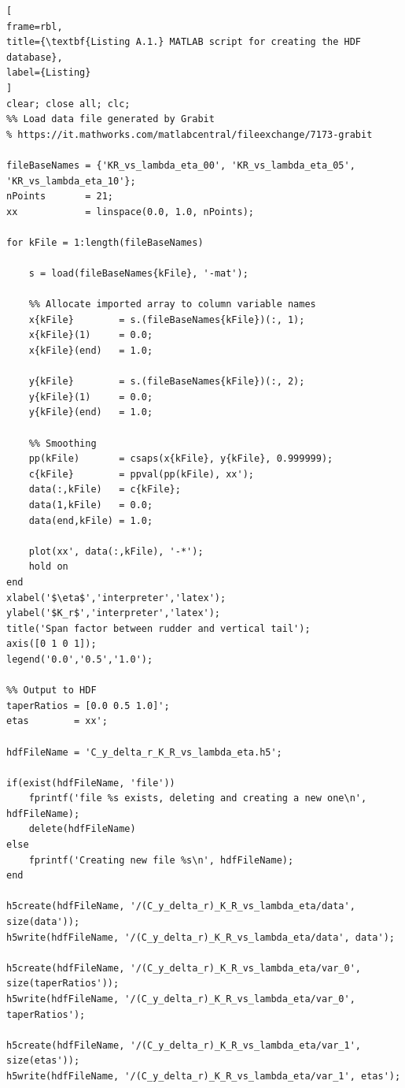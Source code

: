 \bigskip
\lstset{language=Matlab}
\begin{lstlisting}[
frame=rbl,
title={\textbf{Listing A.1.} MATLAB script for creating the HDF database},
label={Listing}
]
clear; close all; clc;
%% Load data file generated by Grabit
% https://it.mathworks.com/matlabcentral/fileexchange/7173-grabit

fileBaseNames = {'KR_vs_lambda_eta_00', 'KR_vs_lambda_eta_05', 'KR_vs_lambda_eta_10'};
nPoints       = 21;
xx            = linspace(0.0, 1.0, nPoints);

for kFile = 1:length(fileBaseNames)
    
    s = load(fileBaseNames{kFile}, '-mat');

    %% Allocate imported array to column variable names
    x{kFile}        = s.(fileBaseNames{kFile})(:, 1);
    x{kFile}(1)     = 0.0;
    x{kFile}(end)   = 1.0;
    
    y{kFile}        = s.(fileBaseNames{kFile})(:, 2);
    y{kFile}(1)     = 0.0;
    y{kFile}(end)   = 1.0;
    
    %% Smoothing
    pp(kFile)       = csaps(x{kFile}, y{kFile}, 0.999999);
    c{kFile}        = ppval(pp(kFile), xx');
    data(:,kFile)   = c{kFile};
    data(1,kFile)   = 0.0;
    data(end,kFile) = 1.0;

    plot(xx', data(:,kFile), '-*');
    hold on
end
xlabel('$\eta$','interpreter','latex');
ylabel('$K_r$','interpreter','latex');
title('Span factor between rudder and vertical tail');
axis([0 1 0 1]);
legend('0.0','0.5','1.0');

%% Output to HDF
taperRatios = [0.0 0.5 1.0]';
etas        = xx';

hdfFileName = 'C_y_delta_r_K_R_vs_lambda_eta.h5';

if(exist(hdfFileName, 'file'))
    fprintf('file %s exists, deleting and creating a new one\n', hdfFileName);
    delete(hdfFileName)
else
    fprintf('Creating new file %s\n', hdfFileName);
end

h5create(hdfFileName, '/(C_y_delta_r)_K_R_vs_lambda_eta/data', size(data'));
h5write(hdfFileName, '/(C_y_delta_r)_K_R_vs_lambda_eta/data', data');

h5create(hdfFileName, '/(C_y_delta_r)_K_R_vs_lambda_eta/var_0', size(taperRatios'));
h5write(hdfFileName, '/(C_y_delta_r)_K_R_vs_lambda_eta/var_0', taperRatios');

h5create(hdfFileName, '/(C_y_delta_r)_K_R_vs_lambda_eta/var_1', size(etas'));
h5write(hdfFileName, '/(C_y_delta_r)_K_R_vs_lambda_eta/var_1', etas');
\end{lstlisting}

